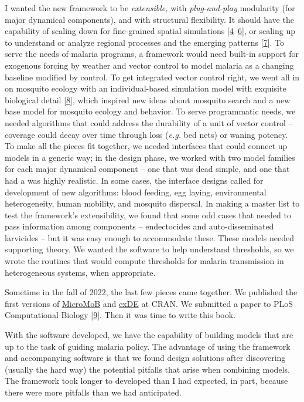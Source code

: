 \documentclass[
]{book}
\begin{document}
I wanted the new framework to be \emph{extensible,} with \emph{plug-and-play} modularity (for major dynamical components), and with structural flexibility. It should have the capability of scaling down for fine-grained spatial simulations {[}\protect\hyperlink{ref-CarterR2002SpatialSimulation}{4}--\protect\hyperlink{ref-PerkinsTA2013HeterogeneityMixing}{6}{]}, or scaling up to understand or analyze regional processes and the emerging patterns {[}\protect\hyperlink{ref-TatemAJ2010InternationalPopulation}{7}{]}. To serve the needs of malaria programs, a framework would need built-in support for exogenous forcing by weather and vector control to model malaria as a changing baseline modified by control. To get integrated vector control right, we went all in on mosquito ecology with an individual-based simulation model with exquisite biological detail {[}\protect\hyperlink{ref-WuSL2020MBITES}{8}{]}, which inspired new ideas about mosquito search and a new base model for mosquito ecology and behavior. To serve programmatic needs, we needed algorithms that could address the durability of a unit of vector control -- coverage could decay over time through loss (\emph{e.g.} bed nets) or waning potency. To make all the pieces fit together, we needed interfaces that could connect up models in a generic way; in the design phase, we worked with two model families for each major dynamical component -- one that was dead simple, and one that had a was highly realistic. In some cases, the interface designs called for development of new algorithms: blood feeding, egg laying, environmental heterogeneity, human mobility, and mosquito dispersal. In making a master list to test the framework's extensibility, we found that some odd cases that needed to pass information among components -- endectocides and auto-disseminated larvicides -- but it was easy enough to accommodate these. These models needed supporting theory. We wanted the software to help understand thresholds, so we wrote the routines that would compute thresholds for malaria transmission in heterogeneous systems, when appropriate.

Sometime in the fall of 2022, the last few pieces came together. We published the first versions of \href{https://cran.r-project.org/package=MicroMoB}{MicroMoB} and \href{https://CRAN.R-project.org/package=exDE}{exDE} at CRAN. We submitted a paper to PLoS Computational Biology {[}\protect\hyperlink{ref-WuSL2022SpatialDynamics}{9}{]}. Then it was time to write this book.

With the software developed, we have the capability of building models that are up to the task of guiding malaria policy. The advantage of using the framework and accompanying software is that we found design solutions after discovering (usually the hard way) the potential pitfalls that arise when combining models. The framework took longer to developed than I had expected, in part, because there were more pitfalls than we had anticipated.
\end{document}
